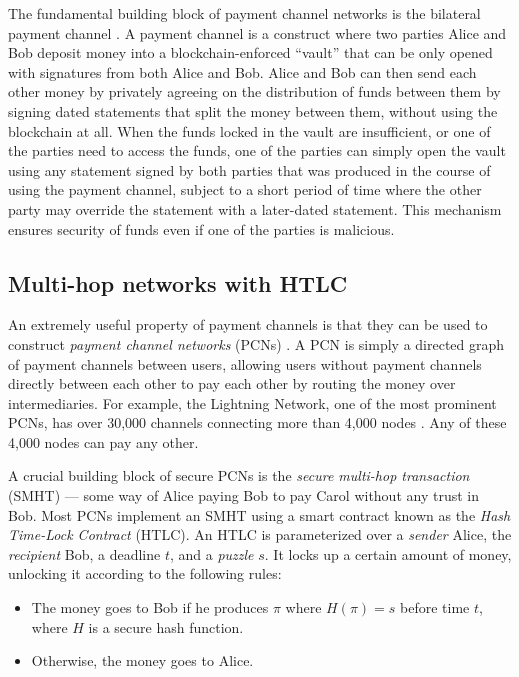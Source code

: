 \documentclass[USenglish,oneside,twocolumn]{article}
\begin{document}
The fundamental building block of payment channel networks is the bilateral payment channel \cite{mccorry2016towards}. A payment channel is a construct where two parties Alice and Bob deposit money into a blockchain-enforced ``vault'' that can be only opened with signatures from both Alice and Bob. Alice and Bob can then send each other money by privately agreeing on the distribution of funds between them by signing dated statements that split the money between them, without using the blockchain at all. When the funds locked in the vault are insufficient, or one of the parties need to access the funds, one of the parties can simply open the vault using any statement signed by both parties that was produced in the course of using the payment channel, subject to a short period of time where the other party may override the statement with a later-dated statement. This mechanism ensures security of funds even if one of the parties is malicious.

\subsection{Multi-hop networks with HTLC}

An extremely useful property of payment channels is that they can be used to construct \emph{payment channel networks} (PCNs) \cite{mccorry2016towards,decker2018eltoo,croman2016scaling}. A PCN is simply a directed graph of payment channels between users, allowing users without payment channels directly between each other to pay each other by routing the money over intermediaries. For example, the Lightning Network, one of the most prominent PCNs, has over 30,000 channels connecting more than 4,000 nodes \cite{github2019lnd}. Any of these 4,000 nodes can pay any other.

A crucial building block of secure PCNs is the \emph{secure multi-hop transaction} (SMHT) --- some way of Alice paying Bob to pay Carol without any trust in Bob. Most PCNs implement an SMHT using a smart contract known as the \emph{Hash Time-Lock Contract} (HTLC). An HTLC is parameterized over a \emph{sender} Alice, the \emph{recipient} Bob, a deadline $t$, and a \emph{puzzle} $s$. It locks up a certain amount of money, unlocking it according to the following rules:
\begin{itemize}
    \item The money goes to Bob if he produces $\pi$ where $H(\pi) = s$ before time $t$, where $H$ is a secure hash function.
    \item Otherwise, the money goes to Alice.
\end{itemize}
\end{document}
